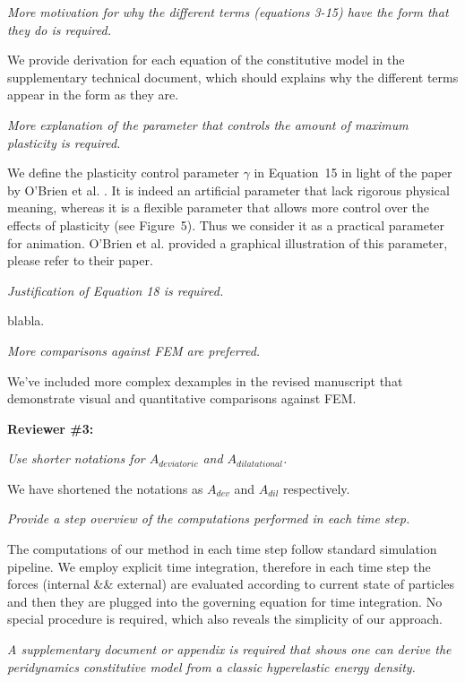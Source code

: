 \emph{More motivation for why the different terms (equations 3-15) have the form that they do is required.}

We provide derivation for each equation of the constitutive model in the supplementary technical document, which should explains why the different terms appear in the form as they are.

\emph{More explanation of the parameter that controls the amount of maximum plasticity is required.}

We define the plasticity control parameter $\gamma$ in Equation~15 in light of the paper by O'Brien et al. \cite{O'Brien:2002:GMA:566654.566579}. It is indeed an artificial parameter that lack rigorous physical meaning, whereas it is a flexible parameter that allows more control over the effects of plasticity (see Figure~5). Thus we consider it as a practical parameter for animation. O'Brien et al. \cite{O'Brien:2002:GMA:566654.566579} provided a graphical illustration of this parameter, please refer to their paper.

\emph{Justification of Equation 18 is required.}

blabla.

\emph{More comparisons against FEM are preferred.}

We've included more complex dexamples in the revised manuscript that demonstrate visual and quantitative comparisons against FEM.

\noindent{}\textbf{Reviewer \#3:}

\emph{Use shorter notations for $A_{deviatoric}$ and $A_{dilatational}$.}

We have shortened the notations as $A_{dev}$ and $A_{dil}$ respectively.

\emph{Provide a step overview of the computations performed in each time step.}

The computations of our method in each time step follow standard simulation pipeline. We employ explicit time integration, therefore in each time step the forces (internal \&\& external) are evaluated according to current state of particles and then they are plugged into the governing equation for time integration. No special procedure is required, which also reveals the simplicity of our approach. 

\emph{A supplementary document or appendix is required that shows one can derive the peridynamics constitutive model from a classic hyperelastic energy density.}

